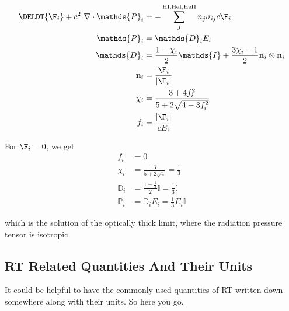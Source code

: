 \begin{align}
	\DELDT{\F_i} + c^2 \ \nabla \cdot \mathds{P}_i &=
		- \sum\limits_{j}^{\mathrm{HI, HeI, HeII}} n_j \sigma_{i j} c \F_i \\
	\mathds{P}_i &= 
		\mathds{D}_i E_i \\
	\mathds{D}_i &= 
		\frac{1- \chi_i}{2} \mathds{I} + \frac{3 \chi_i - 1}{2} \mathbf{n}_i \otimes \mathbf{n}_i\\
	\mathbf{n}_i &= 
		\frac{\F_i}{|\F_i|} \\
	\chi_i &= 
		\frac{3 + 4 f_i ^2}{5 + 2 \sqrt{4 - 3 f_i^2}} \\
	f_i &= 
		\frac{|\F_i|}{c E_i}
\end{align}

For $\F_i = 0$, we get
\begin{align}
	f_i &= 0 \\
	\chi_i &= \frac{3}{5 + 2 \sqrt{4}} = \frac{1}{3} \\
	\mathds{D}_i &= \frac{1- \frac{1}{3}}{2} \mathds{I} = \frac{1}{3} \mathds{I} \\
	\mathds{P}_i &= \mathds{D}_i E_i =  \frac{1}{3} E_i \mathds{I}
\end{align}

which is the solution of the optically thick limit, where the radiation pressure tensor is isotropic.



\subsection{RT Related Quantities And Their Units}

It could be helpful to have the commonly used quantities of RT written down
somewhere along with their units. So here you go.


